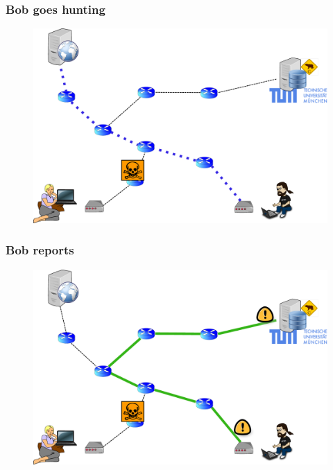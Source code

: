 \begin{frame}
\frametitle{Bob goes hunting}
  \begin{block}{}
    \vskip -1.2cm
    \begin{figure}[t]
    \centering
     \includegraphics[scale=.36]{figures/hunting-2-hunting}
    \end{figure}
  \end{block}
\end{frame}

\begin{frame}
\frametitle{Bob reports}
  \begin{block}{}
    \vskip -1.2cm
    \begin{figure}[t]
    \centering
     \includegraphics[scale=.36]{figures/hunting-3-reporting}
    \end{figure}
  \end{block}
\end{frame}

